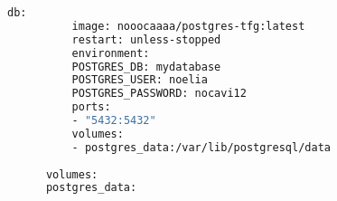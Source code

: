 \begin{appendices}
\begin{figure}[H]
\begin{lstlisting}[language=bash, caption={Fichero Podman-compose para desplegar la bbdd y la app en el servidor}, label=fig:podmancompose]
      db:
          image: nooocaaaa/postgres-tfg:latest
          restart: unless-stopped
          environment:
          POSTGRES_DB: mydatabase
          POSTGRES_USER: noelia
          POSTGRES_PASSWORD: nocavi12
          ports:
          - "5432:5432"
          volumes:
          - postgres_data:/var/lib/postgresql/data
  
      volumes:
      postgres_data:
    \end{lstlisting}
  \end{figure}
  

\end{appendices}